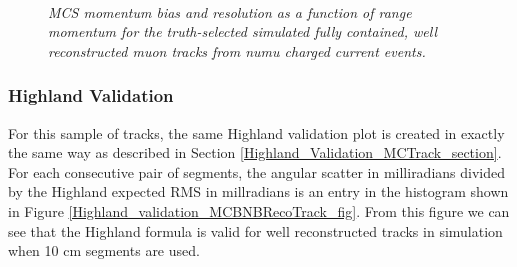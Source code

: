\begin{figure}
\centering
\mbox{
	\quad
	}
\caption{\textit{MCS momentum bias and resolution as a function of range momentum for the truth-selected simulated fully contained, well reconstructed muon tracks from numu charged current events.}}
\label{MCS_range_bias_resolution_MCBNBRecoTrack_fig}
\end{figure}



\subsubsection{Highland Validation}\label{Highland_Validation_MCBNBRecoTrack_section}
For this sample of tracks, the same Highland validation plot is created in exactly the same way as described in Section \ref{Highland_Validation_MCTrack_section}. For each consecutive pair of segments, the angular scatter in milliradians divided by the Highland expected RMS in millradians is an entry in the histogram shown in Figure \ref{Highland_validation_MCBNBRecoTrack_fig}. From this figure we can see that the Highland formula is valid for well reconstructed tracks in simulation when 10 cm segments are used.

